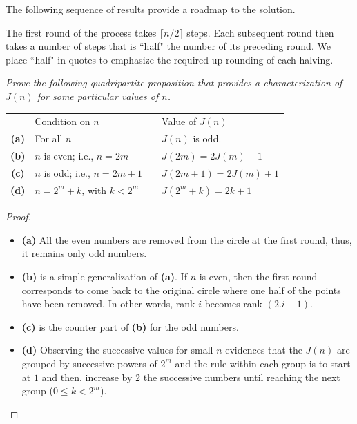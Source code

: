 \begin{itemize}
The following sequence of results provide a roadmap to the solution.

\medskip
%

The first round of the process takes $\lceil n/2 \rceil$ steps.  
Each subsequent round then takes a number of steps that is ``half" the number of its preceding round.  We place ``half" in quotes to emphasize the required up-rounding of each halving.  
\medskip

{\em Prove the following quadripartite proposition 
that provides a characterization of $J(n)$ for some particular values of $n$.

\begin{tabular}{clll}
 & \underline{Condition on $n$} & \hspace*{.1in} & \underline{Value of $J(n)$} \\ 
{\bf (a)} &
For all $n$ &  & $J(n)$ is odd. \\
{\bf (b)} &
$n$ is even; i.e., $n = 2m$ & & $J(2m) = 2J(m)-1$ \\
{\bf (c)} &
$n$ is odd; i.e., $n = 2m+1$ & & $J(2m+1) = 2J(m)+1$ \\
{\bf (d)} &
$n = 2^m+k$, with $k < 2^m$ & & $J(2^m+k) = 2k+1$
\end{tabular}
}

\begin{proof}
\begin{itemize}
\item {\bf (a)} 
All the even numbers are removed from the circle at the first round, thus, it remains only odd numbers.
\medskip

\item {\bf (b)} 
is a simple generalization of {\bf (a)}.  
If $n$ is even, then the first round corresponds to come back to the original circle 
where one half of the points have been removed. 
In other words, rank $i$ becomes rank $(2.i-1)$.
\medskip

\item {\bf (c)} 
is the counter part of {\bf (b)} for the odd numbers.

\item {\bf (d)} 
Observing the successive values for small $n$ evidences that the $J(n)$ are grouped by successive powers of $2^m$
and the rule within each group is to start at $1$ and then, increase by $2$ the successive numbers until reaching the next group
($0 \leq k < 2^m$).


\end{itemize}
\end{proof}
\end{itemize}
